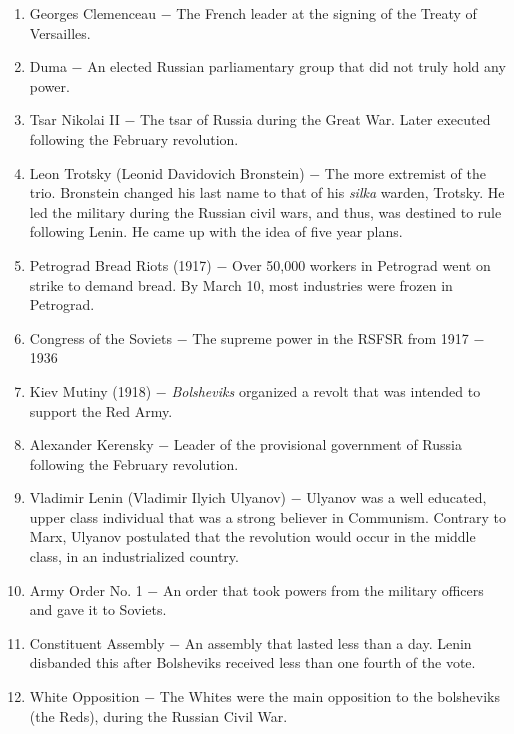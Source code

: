\documentclass[12pt]{article}
\begin{document}
\begin{enumerate}
\item Georges Clemenceau $-$ The French leader at the signing of the Treaty of Versailles.

\item Duma $-$ An elected Russian parliamentary group that did not truly hold any power.

\item Tsar Nikolai II $-$ The tsar of Russia during the Great War. Later executed following the February revolution.

\item Leon Trotsky (Leonid Davidovich Bronstein) $-$ The more extremist of the trio. Bronstein changed his last name to that of his \emph{silka} warden, Trotsky. He led the military during the Russian civil wars, and thus, was destined to rule following Lenin. He came up with the idea of five year plans.

\item Petrograd Bread Riots (1917) $-$ Over 50,000 workers in Petrograd went on strike to demand bread. By March 10, most industries were frozen in Petrograd.

\item Congress of the Soviets $-$ The supreme power in the RSFSR from 1917 $-$ 1936

\item Kiev Mutiny (1918) $-$ \emph{Bolsheviks} organized a revolt that was intended to support the Red Army.

\item Alexander Kerensky $-$ Leader of the provisional government of Russia following the February revolution. 

\item Vladimir Lenin (Vladimir Ilyich Ulyanov) $-$ Ulyanov was a well educated, upper class individual that was a strong believer in Communism. Contrary to Marx, Ulyanov postulated that the revolution would occur in the middle class, in an industrialized country.

\item Army Order No. 1 $-$ An order that took powers from the military officers and gave it to Soviets.

\item Constituent Assembly $-$ An assembly that lasted less than a day. Lenin disbanded this after Bolsheviks received less than one fourth of the vote.

\item White Opposition $-$ The Whites were the main opposition to the bolsheviks (the Reds), during the Russian Civil War.


\end{enumerate}
\end{document}
